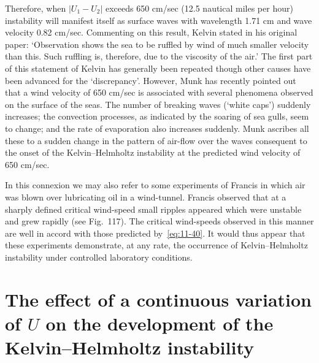 Therefore, when $|U_1-U_2|$ exceeds 650 cm/sec (12.5 nautical miles per hour) instability will manifest itself as surface waves with wavelength 1.71 cm and wave velocity 0.82 cm/sec. Commenting on this result, Kelvin stated in his original paper: `Observation shows the sea to be ruffled by wind of much smaller velocity than this. Such ruffling is, therefore, due to the viscosity of the air.' The first part of this statement of Kelvin has generally been repeated though other causes have been advanced for the `discrepancy'. However, Munk has recently pointed out that a wind velocity of 650 cm/sec is associated with several phenomena observed on the surface of the seas. The number of breaking waves (`white caps') suddenly increases; the convection processes, as indicated by the soaring of sea gulls, seem to change; and the rate of evaporation also increases suddenly. Munk ascribes all these to a sudden change in the pattern of air-flow over the waves consequent to the onset of the Kelvin--Helmholtz instability at the predicted wind velocity of 650 cm/sec.

In this connexion we may also refer to some experiments of Francis in which air was blown over lubricating oil in a wind-tunnel. Francis observed that at a sharply defined critical wind-speed small ripples appeared which were unstable and grew rapidly (see Fig.\ 117). The critical wind-speeds observed in this manner are well in accord with those predicted by~\eqref{eq:11-40}. It would thus appear that these experiments demonstrate, at any rate, the occurrence of Kelvin--Helmholtz instability under controlled laboratory conditions.


\section{The effect of a continuous variation of $U$ on the development of the Kelvin--Helmholtz instability}\label{sec:102}

